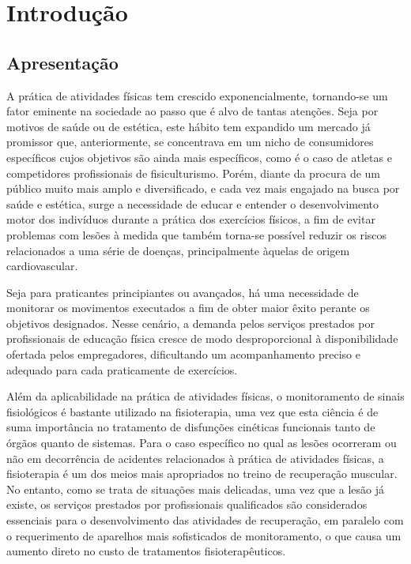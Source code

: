 \chapter{Introdução}

\section{Apresentação}

    

    A prática de atividades físicas tem crescido exponencialmente, tornando-se um fator eminente na sociedade ao passo que é alvo de tantas atenções. Seja por motivos de saúde ou de estética, este hábito tem expandido um mercado já promissor que, anteriormente, se concentrava em um nicho de consumidores específicos cujos objetivos são ainda mais específicos, como é o caso de atletas e competidores profissionais de fisiculturismo. Porém, diante da procura de um público muito mais amplo e diversificado, e cada vez mais engajado na busca por saúde e estética, surge a necessidade de educar e entender o desenvolvimento motor dos indivíduos durante a prática dos exercícios físicos, a fim de evitar problemas com lesões à medida que também torna-se possível reduzir os riscos relacionados a uma série de doenças, principalmente àquelas de origem cardiovascular.
    
    Seja para praticantes principiantes ou avançados, há uma necessidade de monitorar os movimentos executados a fim de obter maior êxito perante os objetivos designados. Nesse cenário, a demanda pelos serviços prestados por profissionais de educação física cresce de modo desproporcional à disponibilidade ofertada pelos empregadores, dificultando um acompanhamento preciso e adequado para cada praticamente de exercícios. 
    
    Além da aplicabilidade na prática de atividades físicas, o monitoramento de sinais fisiológicos é bastante utilizado na fisioterapia, uma vez que esta ciência é de suma importância no tratamento de disfunções cinéticas funcionais tanto de órgãos quanto de sistemas. Para o caso específico no qual as lesões ocorreram ou não em decorrência de acidentes relacionados à prática de atividades físicas, a fisioterapia é um dos meios mais apropriados no treino de recuperação muscular. No entanto, como se trata de situações mais delicadas, uma vez que a lesão já existe, os serviços prestados por profissionais qualificados são considerados essenciais para o desenvolvimento das atividades de recuperação, em paralelo com o requerimento de aparelhos mais sofisticados de monitoramento, o que causa um aumento direto no custo de tratamentos fisioterapêuticos.
    
